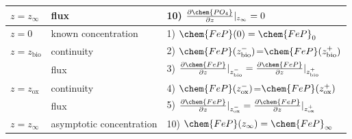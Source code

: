\documentclass[gmd, manuscript]{copernicus}
\begin{document}
\begin{table}[tbp]
\begin{tabular}{ |l| l| l|}
$z=z_{\infty}$& flux & 10) $\frac{\partial \chem{PO_4}}{\partial z}|_{z_\infty}=0$\\
\hline
$z=0$& known concentration& 1) $\chem{FeP}(0)=\chem{FeP}_0$  \\
$z=z_{\mathrm{bio}}$&continuity& 2) $\chem{FeP}(z_{\mathrm{bio}}^-)$=$\chem{FeP}(z_{\mathrm{bio}}^+)$\\
  & flux & 3) $\frac{\partial \chem{FeP}}{\partial z}|_{z_{\mathrm{bio}}^-}=\frac{\partial \chem{FeP}}{\partial z}|_{z_{\mathrm{bio}}^+}$\\
$z=z_{\mathrm{ox}}$& continuity& 4) $\chem{FeP}(z_{\mathrm{ox}}^-)$=$\chem{FeP}(z_{\mathrm{ox}}^+)$\\
  & flux & 5) $\frac{\partial \chem{FeP}}{\partial z}|_{z_{\mathrm{ox}}^-} =\frac{\partial \chem{FeP}}{\partial z}|_{z_{\mathrm{ox}}^+}$\\
$z=z_{\infty}$& asymptotic concentration & 10) $\chem{FeP}(z_\infty)=\chem{FeP}_\infty$\\
\hline    
\end{tabular}
\label{Tab:BC_PO4+M}
\end{table}
\end{document}
